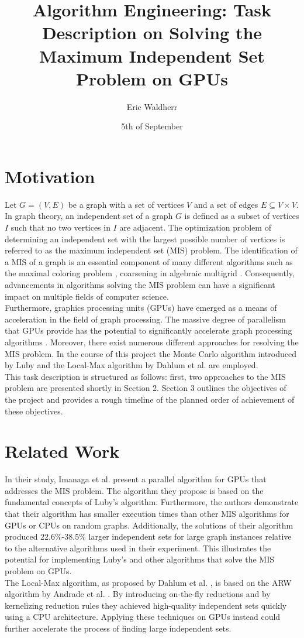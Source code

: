 \documentclass[acmsmall,nonacm,screen,review]{acmart}
\title{Algorithm Engineering: Task Description on Solving the Maximum Independent Set Problem on GPUs}
\author{Eric Waldherr}
\affiliation{%
  \institution{Heidelberg University}
  \streetaddress{Im Neuenheimer Feld 205}
  \city{Heidelberg}
  \state{Baden-Württemberg}
  \country{Germany}
  \postcode{69120}
}
\date{5th of September}
\begin{document}
\begin{abstract}
\end{abstract}
\maketitle

\section{Motivation}
Let $G = (V,E)$ be a graph with a set of vertices $V$ and a set of edges $E \subseteq V \times V$. In graph theory, an independent set of a graph $G$ is defined as a subset of vertices $I$ such that no two vertices in $I$ are adjacent. The optimization problem of determining an independent set with the largest possible number of vertices is referred to as the maximum independent set (MIS) problem. The identification of a MIS of a graph is an essential component of many different algorithms such as the maximal coloring problem \cite{Luby}, coarsening in algebraic multigrid \cite{multigrid}. Consequently, advancements in algorithms solving the MIS problem can have a significant impact on multiple fields of computer science.\\ 
Furthermore, graphics processing units (GPUs) have emerged as a means of acceleration in the field of graph processing. The massive degree of parallelism that GPUs provide has the potential to significantly accelerate graph processing algorithms \cite{GPUs}. Moreover, there exist numerous different approaches for resolving the MIS problem. In the course of this project the Monte Carlo algorithm introduced by Luby \cite{Luby} and the Local-Max algorithm by Dahlum et al. \cite{local_max} are employed. \\   
This task description is structured as follows: first, two approaches to the MIS problem are presented shortly in Section 2. Section 3 outlines the objectives of the project and provides a rough timeline of the planned order of achievement of these objectives.
\section{Related Work}
In their study, Imanaga et al. \cite{Rel_Prio} present a parallel algorithm for GPUs that addresses the MIS problem. The algorithm they propose is based on the fundamental concepts of Luby's algorithm. Furthermore, the authors demonstrate that their algorithm has smaller execution times than other MIS algorithms for GPUs or CPUs on random graphs. Additionally, the solutions of their algorithm produced 22.6\%-38.5\% larger independent sets for large graph instances relative to the alternative algorithms used in their experiment. This illustrates the potential for implementing Luby's and other algorithms that solve the MIS problem on GPUs. \\
The Local-Max algorithm, as proposed by Dahlum et al. \cite{local_max}, is based on the ARW algorithm by Andrade et al. \cite{ARW}. By introducing on-the-fly reductions and by kernelizing reduction rules they achieved high-quality independent sets quickly using a CPU architecture. Applying these techniques on GPUs instead could further accelerate the process of finding large independent sets.
\end{document}
